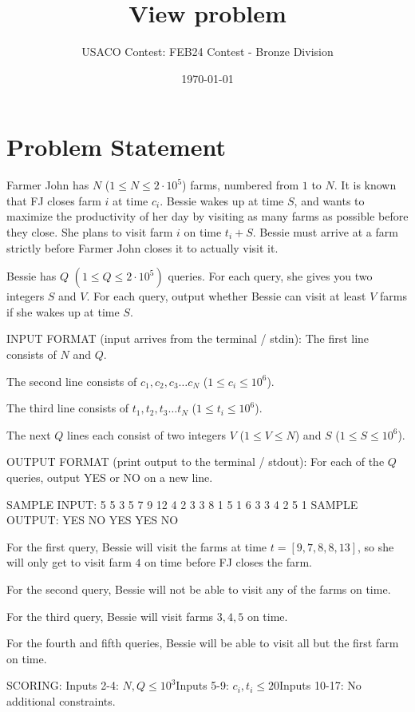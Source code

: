 \documentclass[12pt]{article}
\title{View problem}
\author{USACO Contest: FEB24 Contest - Bronze Division}
\date{\today}
\begin{document}
\maketitle

\section*{Problem Statement}


Farmer John has $N$ ($1 \leq N \leq 2 \cdot 10^5$) farms, numbered from $1$ to
$N$. It is known that FJ closes farm $i$ at time $c_i$. Bessie wakes up at time
$S$, and wants to maximize the productivity of her day by visiting as many farms
as possible before they close. She plans to visit farm $i$ on time $t_i + S$.
Bessie must arrive at a farm strictly before Farmer John closes it to actually visit it.

Bessie has $Q$ $(1 \leq Q \leq 2 \cdot 10^5)$ queries. For each query, she gives
you two integers $S$ and $V$. For each query, output whether Bessie can visit at
least $V$ farms if she wakes up at time $S$.

INPUT FORMAT (input arrives from the terminal / stdin):
The first line consists of $N$ and $Q$.

The second line consists of $c_1, c_2, c_3 \dots c_N$ ($1 \leq c_i \leq 10^6$).

The third line consists of $t_1, t_2, t_3 \dots t_N$ ($1 \leq t_i \leq 10^6$).

The next $Q$ lines each consist of two integers $V$ ($1 \leq V \leq N$) and $S$
($1 \leq S \leq 10^6$).

OUTPUT FORMAT (print output to the terminal / stdout):
For each of the $Q$ queries, output YES or NO on a new line.

SAMPLE INPUT:
5 5
3 5 7 9 12
4 2 3 3 8
1 5
1 6
3 3
4 2
5 1
SAMPLE OUTPUT: 
YES
NO
YES
YES
NO

For the first query, Bessie will visit the farms at time $t = [9, 7, 8, 8, 13]$,
so she will only get to visit farm $4$ on time before FJ closes the farm.

For the second query, Bessie will not be able to visit any of the farms on time.

For the third query, Bessie will visit farms $3, 4, 5$ on time.

For the fourth and fifth queries, Bessie will be able to visit all but the first
farm on time.

SCORING:
Inputs 2-4: $N,Q\le 10^3$Inputs 5-9: $c_i, t_i \le 20$Inputs 10-17: No additional constraints.
\end{document}
